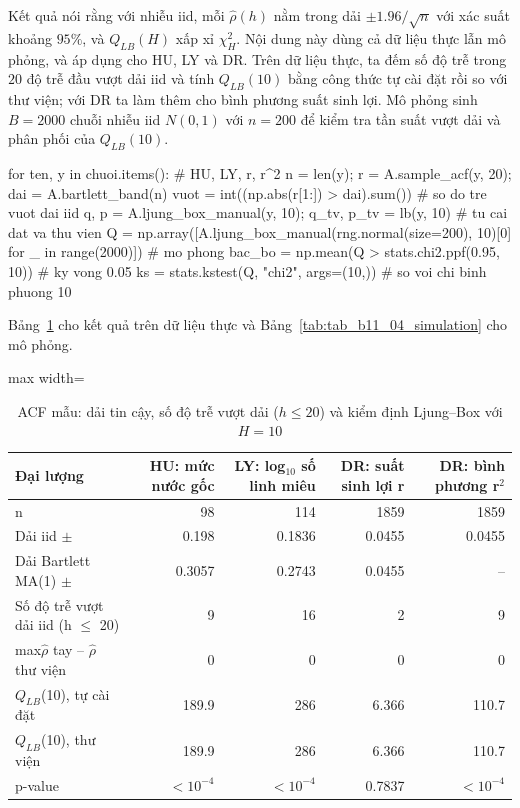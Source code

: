  Kết quả  nói rằng với nhiễu iid, mỗi $\hat\rho(h)$ nằm trong dải $\pm1.96/\sqrt n$ với xác suất khoảng $95\%$, và $Q_{LB}(H)$ xấp xỉ $\chi^2_H$.
 Nội dung này dùng cả dữ liệu thực lẫn mô phỏng, và áp dụng cho HU, LY và DR. Trên dữ liệu thực, ta đếm số độ trễ trong $20$ độ trễ đầu vượt dải iid và tính $Q_{LB}(10)$ bằng công thức tự cài đặt rồi so với thư viện; với DR ta làm thêm cho bình phương suất sinh lợi. Mô phỏng sinh $B=2000$ chuỗi nhiễu iid $N(0,1)$ với $n=200$ để kiểm tra tần suất vượt dải và phân phối của $Q_{LB}(10)$.
\begin{codeblock}
for ten, y in chuoi.items():                 # HU, LY, r, r^2
    n = len(y); r = A.sample_acf(y, 20); dai = A.bartlett_band(n)
    vuot = int((np.abs(r[1:]) > dai).sum())              # so do tre vuot dai iid
    q, p = A.ljung_box_manual(y, 10); q_tv, p_tv = lb(y, 10)   # tu cai dat va thu vien
Q = np.array([A.ljung_box_manual(rng.normal(size=200), 10)[0] for _ in range(2000)])   # mo phong
bac_bo = np.mean(Q > stats.chi2.ppf(0.95, 10))           # ky vong 0.05
ks = stats.kstest(Q, "chi2", args=(10,))                 # so voi chi binh phuong 10
\end{codeblock}
 Bảng~\ref{tab:tab_b11_04_acf_ljungbox} cho kết quả trên dữ liệu thực và Bảng~\ref{tab:tab_b11_04_simulation} cho mô phỏng.
\begin{table}[H]
\centering\footnotesize
\caption{ACF mẫu: dải tin cậy, số độ trễ vượt dải ($h\le20$) và kiểm định Ljung–Box với $H=10$}\label{tab:tab_b11_04_acf_ljungbox}
\begin{adjustbox}{max width=\linewidth}
\begin{tabular}{|l|r|r|r|r|}
\toprule
Đại lượng & HU: mức nước gốc & LY: log$_{10}$ số linh miêu & DR: suất sinh lợi r & DR: bình phương r$^{2}$ \\
\midrule
n & 98 & 114 & 1859 & 1859 \\
Dải iid $\pm$ & 0.198 & 0.1836 & 0.0455 & 0.0455 \\
Dải Bartlett MA(1) $\pm$ & 0.3057 & 0.2743 & 0.0455 & – \\
Số độ trễ vượt dải iid (h $\le$ 20) & 9 & 16 & 2 & 9 \\
max\textbar{}$\hat{\rho}$ tay – $\hat{\rho}$ thư viện\textbar{} & 0 & 0 & 0 & 0 \\
$Q_{LB}$(10), tự cài đặt & 189.9 & 286 & 6.366 & 110.7 \\
$Q_{LB}$(10), thư viện & 189.9 & 286 & 6.366 & 110.7 \\
p-value & $<10^{-4}$ & $<10^{-4}$ & 0.7837 & $<10^{-4}$ \\
\bottomrule
\end{tabular}
\end{adjustbox}\par{}
\end{table}
